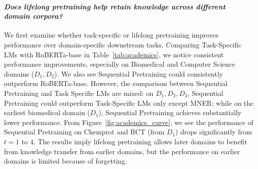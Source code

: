 
\paragraph{\textit{Does lifelong pretraining help retain knowledge across different domain corpora?}}
We first examine whether task-specific or lifelong pretraining improves performance over domain-specific downstream tasks. %
Comparing Task-Specific LMs with RoBERTa-base in Table~\ref{tab:academics}, we notice consistent performance improvements, especially on Biomedical and Computer Science domains ($D_1, D_2$). %
We also see Sequential Pretraining could consistently outperform RoBERTa-base. However, the comparison between Sequential Pretraining and Task Specific LMs are mixed: on $D_1, D_2, D_3$, Sequential Pretraining could outperform Task-Specific LMs only except MNER; while on the earliest biomedical domain ($D_1$), Sequential Pretraining achieves substantially lower performance. From Figure~\ref{fig:academics_curve}, we see the performance of Sequential Pretraining on Chemprot and RCT (from $D_1$) drops significantly from $t=1$ to $4$. %
The results imply lifelong pretraining allows later domains to benefit from knowledge transfer from earlier domains, but the performance on earlier domains is limited because of forgetting.



